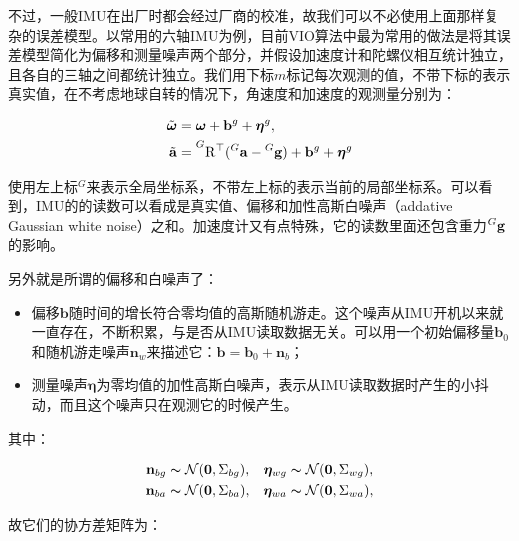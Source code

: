 不过，一般IMU在出厂时都会经过厂商的校准，故我们可以不必使用上面那样复杂的误差模型。以常用的六轴IMU为例，目前VIO算法中最为常用的做法是将其误差模型简化为偏移和测量噪声两个部分，并假设加速度计和陀螺仪相互统计独立，且各自的三轴之间都统计独立。我们用下标$m$标记每次观测的值，不带下标的表示真实值，在不考虑地球自转的情况下，角速度和加速度的观测量分别为\citep{mourikis2007multi}：

\begin{equation}
\begin{aligned}
    \tilde{\bm\omega} &= \bm\omega + \mathbf{b}^g + \bm\eta^g,  \\
    \tilde{\mathbf a} &= \prescript{G}{}{\mathrm{R}^\top}
                         (\prescript{G}{}{\mathbf a} - \prescript{G}{}{\mathbf g}) +
                         \mathbf{b}^g + \bm\eta^g
\end{aligned}
\end{equation}

使用左上标$^G$来表示全局坐标系，不带左上标的表示当前的局部坐标系。可以看到，IMU的的读数可以看成是真实值、偏移和加性高斯白噪声（addative Gaussian white noise）之和。加速度计又有点特殊，它的读数里面还包含重力$\prescript{G}{}{\mathbf g}$的影响。

另外就是所谓的偏移和白噪声了：
\begin{itemize}
    \item 偏移$\mathbf{b}$随时间的增长符合零均值的高斯随机游走。这个噪声从IMU开机以来就一直存在，不断积累，与是否从IMU读取数据无关。可以用一个初始偏移量$\mathbf{b}_0$和随机游走噪声$\mathbf{n}_w$来描述它：$\mathbf{b} = \mathbf{b}_0 + \mathbf{n}_b$；
    \item 测量噪声$\bm\eta$为零均值的加性高斯白噪声，表示从IMU读取数据时产生的小抖动，而且这个噪声只在观测它的时候产生。
\end{itemize}

其中：

\begin{equation}
\begin{aligned}
    \mathbf{n}_{bg} & \thicksim \mathcal{N}(\mathbf{0}, \mathrm\Sigma_{bg}), &
    \bm\eta_{wg}    & \thicksim \mathcal{N}(\mathbf{0}, \mathrm\Sigma_{wg}), \\
    \mathbf{n}_{ba} & \thicksim \mathcal{N}(\mathbf{0}, \mathrm\Sigma_{ba}), &
    \bm\eta_{wa}    & \thicksim \mathcal{N}(\mathbf{0}, \mathrm\Sigma_{wa}),
\end{aligned}
\end{equation}

故它们的协方差矩阵为：

